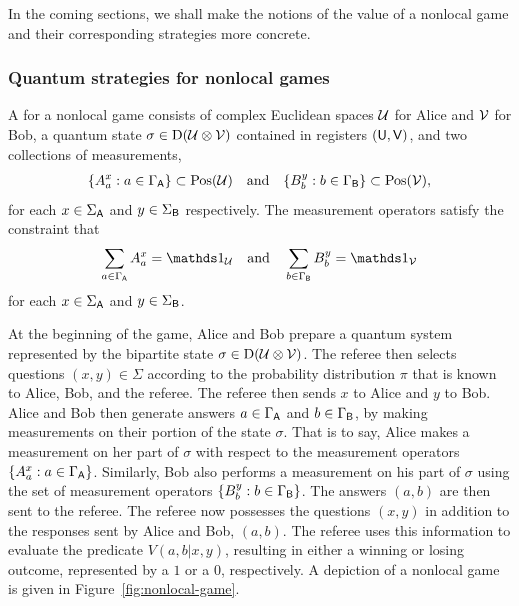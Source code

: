 In the coming sections, we shall make the notions of the value of a nonlocal game and their corresponding strategies more concrete. 

\subsubsection*{Quantum strategies for nonlocal games}
\label{sec:quantum-strategies-for-nonlocal-games}

A  for a nonlocal game consists of complex Euclidean spaces $\mathcal{U}$ for Alice and $\mathcal{V}$ for Bob, a quantum state $\sigma \in \mathrm{D}(\mathcal{U} \otimes \mathcal{V})$ contained in registers $(\mathsf{U},\mathsf{V})$, and two collections of measurements, 
\begin{align}
	\{ A_a^x : a \in \Gamma_{\mathsf{A}} \} \subset \mathrm{Pos}(\mathcal{U}) \quad \textnormal{and} \quad \{ B_b^y : b \in \Gamma_{\mathsf{B}} \} \subset \mathrm{Pos}(\mathcal{V}), 
\end{align}
for each $x \in \Sigma_{\mathsf{A}}$ and $y \in \Sigma_{\mathsf{B}}$ respectively. The measurement operators satisfy the constraint that 
\begin{align}
	\sum_{a \in \GammaA} A_a^x = \I_{\U} \quad \textnormal{and} \quad \sum_{b \in \GammaB} B_b^y = \I_{\V}
\end{align}
for each $x \in \Sigma_{\mathsf{A}}$ and $y \in \Sigma_{\mathsf{B}}$. 

At the beginning of the game, Alice and Bob prepare a quantum system represented by the bipartite state $\sigma \in \mathrm{D}(\mathcal{U} \otimes \mathcal{V})$. The referee then selects questions $(x,y) \in \Sigma$ according to the probability distribution $\pi$ that is known to Alice, Bob, and the referee. The referee then sends $x$ to Alice and $y$ to Bob. Alice and Bob then generate answers $a \in \Gamma_{\mathsf{A}}$ and $b \in \Gamma_{\mathsf{B}}$, by making measurements on their portion of the state $\sigma$. That is to say, Alice makes a measurement on her part of $\sigma$ with respect to the measurement operators $\{ A_a^x : a \in \Gamma_{\mathsf{A}} \}$. Similarly, Bob also performs a measurement on his part of $\sigma$ using the set of measurement operators $\{ B_b^y : b \in \Gamma_{\mathsf{B}} \}$. The answers $(a,b)$ are then sent to the referee. The referee now possesses the questions $(x,y)$ in addition to the responses sent by Alice and Bob, $(a,b)$. The referee uses this information to evaluate the predicate $V(a,b|x,y)$, resulting in either a winning or losing outcome, represented by a $1$ or a $0$, respectively. A depiction of a nonlocal game is given in Figure~\ref{fig:nonlocal-game}. 

